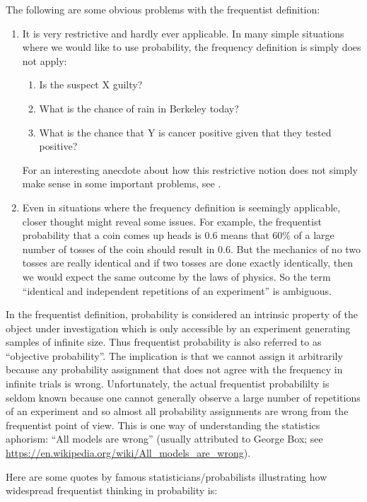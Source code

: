 \documentclass{scrartcl}
\begin{document}
The following are some obvious problems with the frequentist
definition:
\begin{enumerate}
\item It is very restrictive and hardly ever applicable. In many simple
  situations where we would like to use probability, the frequency
  definition is simply does not apply: 
  \begin{enumerate}
  \item Is the suspect X guilty?
  \item What is the chance of rain in Berkeley today?
  \item What is the chance that Y is cancer positive given that
    they tested positive? 
  \end{enumerate}
 For an interesting anecdote about how this restrictive notion does not simply
 make sense in some important problems, see \citet[pages
 43-44]{DeGrootBlackwell}.  
\item Even in situations where the frequency definition is
  seemingly applicable, closer thought might reveal some issues. For
  example, the frequentist probability that a coin comes up
  heads is 0.6 means that 60\% of a large number of tosses of the coin
  should result in $0.6$. But the mechanics of no two tosses are really identical and
  if two tosses are done exactly identically, then we would expect the
  same outcome by the laws of physics. So the term ``identical and
  independent repetitions of an experiment'' is ambiguous.
\end{enumerate}

In the frequentist definition, probability is considered an intrinsic
property of the object under investigation which is only accessible by
an experiment generating samples of infinite size. Thus frequentist
probability is also referred to as ``objective probability''. The 
implication is that we cannot assign it arbitrarily because any
probability assignment that does not agree with the frequency in
infinite trials is wrong. Unfortunately, the actual frequentist
probabililty is seldom known because one cannot generally observe a
large number of repetitions of an experiment and so almost all
probability assignments are wrong from the frequentist point of
view. This is one way of understanding the statistics aphorism: ``All models are
wrong'' (usually attributed to George Box; see
\url{https://en.wikipedia.org/wiki/All_models_are_wrong}).

Here are some quotes by famous statisticians/probabilists illustrating
how widespread frequentist thinking in probability is:
\end{document}

